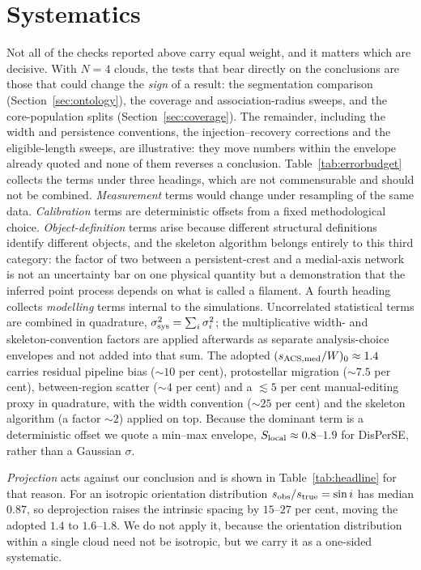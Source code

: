\documentclass[usenatbib,twoside,twocolumn]{mnras}
\begin{document}
\section{Systematics}
\label{sec:systematics}


Not all of the checks reported above carry equal weight, and it matters which are decisive. With $N=4$ clouds, the tests that bear directly on the conclusions are those that could change the \emph{sign} of a result: the segmentation comparison (Section~\ref{sec:ontology}), the coverage and association-radius sweeps, and the core-population splits (Section~\ref{sec:coverage}). The remainder, including the width and persistence conventions, the injection--recovery corrections and the eligible-length sweeps, are illustrative: they move numbers within the envelope already quoted and none of them reverses a conclusion. Table~\ref{tab:errorbudget} collects the terms under three headings, which are not commensurable and should not be combined. \emph{Measurement} terms would change under resampling of the same data. \emph{Calibration} terms are deterministic offsets from a fixed methodological choice. \emph{Object-definition} terms arise because different structural definitions identify different objects, and the skeleton algorithm belongs entirely to this third category: the factor of two between a persistent-crest and a medial-axis network is not an uncertainty bar on one physical quantity but a demonstration that the inferred point process depends on what is called a filament. A fourth heading collects \emph{modelling} terms internal to the simulations. Uncorrelated statistical terms are combined in quadrature, $\sigma_{\rm sys}^2=\sum_i\sigma_i^2$; the multiplicative width- and skeleton-convention factors are applied afterwards as separate analysis-choice envelopes and not added into that sum. The adopted $(s_{\rm ACS,med}/W)_0\approx1.4$ carries residual pipeline bias ($\sim10$ per cent), protostellar migration ($\sim7.5$ per cent), between-region scatter ($\sim4$ per cent) and a $\lesssim5$ per cent manual-editing proxy in quadrature, with the width convention ($\sim25$ per cent) and the skeleton algorithm (a factor $\sim2$) applied on top. Because the dominant term is a deterministic offset we quote a min--max envelope, $S_{\rm local}\approx0.8$--$1.9$ for DisPerSE, rather than a Gaussian $\sigma$.

\emph{Projection} acts against our conclusion and is shown in Table~\ref{tab:headline} for that reason. For an isotropic orientation distribution $s_{\rm obs}/s_{\rm true}=\sin i$ has median $0.87$, so deprojection raises the intrinsic spacing by $15$--$27$ per cent, moving the adopted $1.4$ to $1.6$--$1.8$. We do not apply it, because the orientation distribution within a single cloud need not be isotropic, but we carry it as a one-sided systematic.
\end{document}
